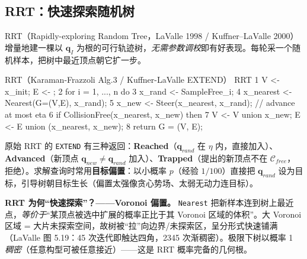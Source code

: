 \subsection{RRT：快速探索随机树}
\label{sec:plan-rrt}

RRT（Rapidly-exploring Random Tree，LaValle 1998 / Kuffner--LaValle 2000\cite{kuffner2000rrtconnect}）增量地建一棵以 $\mathbf{q}_I$ 为根的可行轨迹树，\emph{无需参数调校}即有好表现。每轮采一个随机样本，把树中最近顶点朝它扩一步。

\begin{algo}\label{alg:plan-rrt}
\end{algo}
\begin{codebox}[text]{RRT（Karaman-Frazzoli Alg.3 / Kuffner-LaValle EXTEND）}
RRT
 1  V <- {x_init};  E <- {};
 2  for i = 1, ..., n do
 3      x_rand    <- SampleFree_i;
 4      x_nearest <- Nearest(G=(V,E), x_rand);
 5      x_new     <- Steer(x_nearest, x_rand);          // advance at most eta
 6      if CollisionFree(x_nearest, x_new) then
 7          V <- V union {x_new};  E <- E union {(x_nearest, x_new)};
 8  return G = (V, E);
\end{codebox}

\noindent 原始 RRT 的 \texttt{EXTEND} 有三种返回：\textbf{Reached}（$\mathbf{q}_{rand}$ 在 $\eta$ 内，直接加入）、\textbf{Advanced}（新顶点 $\mathbf{q}_{new}\ne\mathbf{q}_{rand}$ 加入）、\textbf{Trapped}（提出的新顶点不在 $\mathcal{C}_{free}$，拒绝）。求解查询时常用\textbf{目标偏置}：以小概率 $p$（经验 $1/100$）直接把 $\mathbf{q}_{rand}$ 设为目标，引导树朝目标生长（偏置太强像贪心势场、太弱无动力连目标）。

\begin{insight}
\textbf{RRT 为何“快速探索”？——Voronoi 偏置。}\;
\texttt{Nearest} 把新样本连到树上最近点，\emph{等价于}“某顶点被选中扩展的概率正比于其 Voronoi 区域的体积”。大 Voronoi 区域 = 大片未探索空间，故树被“拉”向边界/未探索区，呈分形式快速铺满（LaValle 图 5.19：45 次迭代即触达四角，2345 次渐稠密）。极限下树以概率 1 \emph{稠密}（任意构型可被任意接近）——这是 RRT 概率完备的几何根。
\end{insight}

